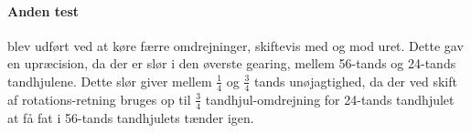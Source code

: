 \paragraph{Anden test} blev udført ved at køre færre omdrejninger, skiftevis med og mod uret.
Dette gav en upræcision, da der er slør i den øverste gearing, mellem 56-tands og 24-tands tandhjulene.
Dette slør giver mellem $\frac{1}{4}$ og $\frac{3}{4}$ tands unøjagtighed, da der ved skift af rotations-retning bruges op til $\frac{3}{4}$ tandhjul-omdrejning for 24-tands tandhjulet at få fat i 56-tands tandhjulets tænder igen.